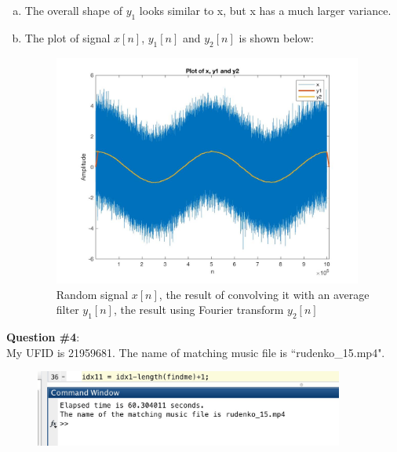 \documentclass[a4paper]{article}
\begin{document}
\begin{spacing}{2.0}
\begin{enumerate}[(a)]
\item The overall shape of $y_1$ looks similar to x, but x has a much larger variance.

\item The plot of signal $x[n]$, $y_1[n]$ and $y_2[n]$ is shown below:
\begin{figure}[H]
\centering 
\includegraphics[width=4in]{Q3d.jpg}
\caption{Random signal $x[n]$, the result of convolving it with an average filter $y_1[n]$, the result using Fourier transform $y_2[n]$}
\end{figure}
\end{enumerate}

\Large\textbf{ Question \#4}:  \\
\normalsize
My UFID is 21959681. The name of matching music file is ``rudenko\_15.mp4".
\begin{figure}[H]
\centering
\includegraphics[width=4in]{Q4.jpg}
\end{figure}


\end{spacing}
\end{document}
